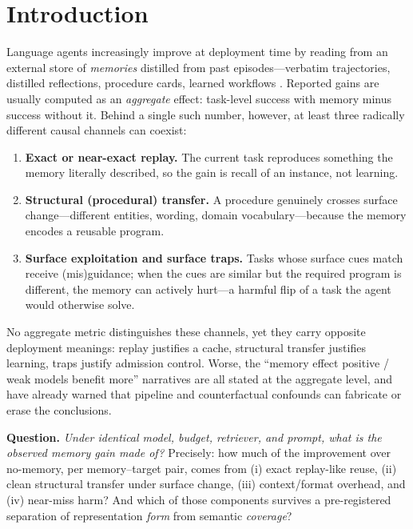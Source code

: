 \section{Introduction}

Language agents increasingly improve at deployment time by reading from an external store of \emph{memories} distilled from past episodes---verbatim trajectories, distilled reflections, procedure cards, learned workflows \citep{shinn2023reflexion,zhao2024expel,wang2025awm,fang2025memp,mcma2026,reme2026}. Reported gains are usually computed as an \emph{aggregate} effect: task-level success with memory minus success without it. Behind a single such number, however, at least three radically different causal channels can coexist:

\begin{enumerate}[leftmargin=1.6em]
  \item \textbf{Exact or near-exact replay.} The current task reproduces something the memory literally described, so the gain is recall of an instance, not learning.
  \item \textbf{Structural (procedural) transfer.} A procedure genuinely crosses surface change---different entities, wording, domain vocabulary---because the memory encodes a reusable program.
  \item \textbf{Surface exploitation and surface traps.} Tasks whose surface cues match receive (mis)guidance; when the cues are similar but the required program is different, the memory can actively hurt---a harmful flip of a task the agent would otherwise solve.
\end{enumerate}

No aggregate metric distinguishes these channels, yet they carry opposite deployment meanings: replay justifies a cache, structural transfer justifies learning, traps justify admission control. Worse, the ``memory effect positive / weak models benefit more'' narratives \citep{feng2026transplants,procedmem2025,stitch2026camebench} are all stated at the aggregate level, and \citet{memdelta2026,bridge2026} have already warned that pipeline and counterfactual confounds can fabricate or erase the conclusions.

\textbf{Question.} \emph{Under identical model, budget, retriever, and prompt, what is the observed memory gain made of?} Precisely: how much of the improvement over no-memory, per memory--target pair, comes from (i) exact replay-like reuse, (ii) clean structural transfer under surface change, (iii) context/format overhead, and (iv) near-miss harm? And which of those components survives a pre-registered separation of representation \emph{form} from semantic \emph{coverage}?

